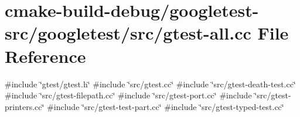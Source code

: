 \hypertarget{gtest-all_8cc}{}\section{cmake-\/build-\/debug/googletest-\/src/googletest/src/gtest-\/all.cc File Reference}
\label{gtest-all_8cc}
{\ttfamily \#include \char`\"{}gtest/gtest.\+h\char`\"{}}\newline
{\ttfamily \#include \char`\"{}src/gtest.\+cc\char`\"{}}\newline
{\ttfamily \#include \char`\"{}src/gtest-\/death-\/test.\+cc\char`\"{}}\newline
{\ttfamily \#include \char`\"{}src/gtest-\/filepath.\+cc\char`\"{}}\newline
{\ttfamily \#include \char`\"{}src/gtest-\/port.\+cc\char`\"{}}\newline
{\ttfamily \#include \char`\"{}src/gtest-\/printers.\+cc\char`\"{}}\newline
{\ttfamily \#include \char`\"{}src/gtest-\/test-\/part.\+cc\char`\"{}}\newline
{\ttfamily \#include \char`\"{}src/gtest-\/typed-\/test.\+cc\char`\"{}}\newline
